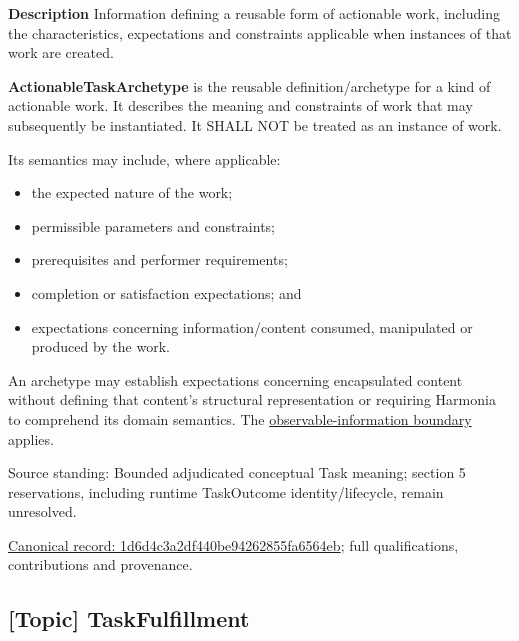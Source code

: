 \textbf{Description}
Information defining a reusable form of actionable work, including the characteristics, expectations and constraints applicable when instances of that work are created.



\textbf{ActionableTaskArchetype} is the reusable definition/archetype for a kind of
actionable work. It describes the meaning and constraints of work that may
subsequently be instantiated. It SHALL NOT be treated as an instance of work.



Its semantics may include, where applicable:



\begin{itemize}


\item the expected nature of the work;

\item permissible parameters and constraints;

\item prerequisites and performer requirements;

\item completion or satisfaction expectations; and

\item expectations concerning information/content consumed, manipulated or
  produced by the work.

\end{itemize}


An archetype may establish expectations concerning encapsulated content
without defining that content's structural representation or requiring
Harmonia to comprehend its domain semantics. The
\hyperref[element:10284034c8534b639284386b064f2c54]{observable-information boundary}
applies.



Source standing: Bounded adjudicated conceptual Task meaning; section 5 reservations, including runtime TaskOutcome identity/lifecycle, remain unresolved.


{\footnotesize \href{../../../../continuum/application/data-object/topic/1d6d4c3a2df440be94262855fa6564eb.md}{Canonical record: 1d6d4c3a2df440be94262855fa6564eb}; full qualifications, contributions and provenance.}\par
\subsection{[Topic] TaskFulfillment}

